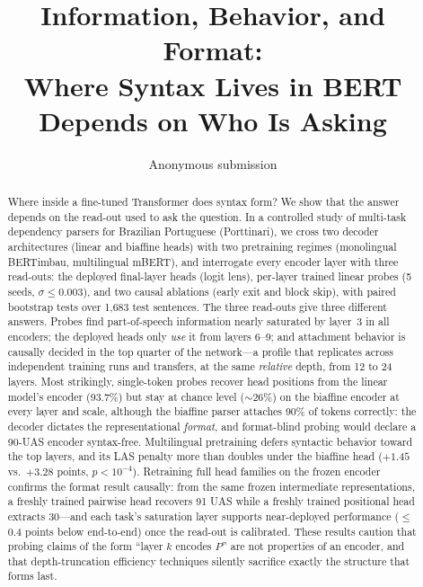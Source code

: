 \documentclass[letterpaper]{article}
\title{Information, Behavior, and Format:\\
Where Syntax Lives in BERT Depends on Who Is Asking}
\author{Anonymous submission}
\begin{document}
\maketitle

\begin{abstract}
Where inside a fine-tuned Transformer does syntax form? We show that the answer
depends on the read-out used to ask the question. In a controlled study of
multi-task dependency parsers for Brazilian Portuguese (Porttinari), we cross
two decoder architectures (linear and biaffine heads) with two pretraining
regimes (monolingual BERTimbau, multilingual mBERT), and interrogate every
encoder layer with three read-outs: the deployed final-layer heads (logit
lens), per-layer trained linear probes (5 seeds, $\sigma \leq 0.003$), and two
causal ablations (early exit and block skip), with paired bootstrap tests over
1{,}683 test sentences. The three read-outs give three different answers.
Probes find part-of-speech information nearly saturated by layer~3 in all
encoders; the deployed heads only \emph{use} it from layers 6--9; and
attachment behavior is causally decided in the top quarter of the network---a
profile that replicates across independent training runs and transfers, at the
same \emph{relative} depth, from 12 to 24 layers. Most strikingly, single-token
probes recover head positions from the linear model's encoder (93.7\%) but
stay at chance level ($\sim$26\%) on the biaffine encoder at every layer and
scale, although the biaffine parser attaches 90\% of tokens correctly: the
decoder dictates the representational \emph{format}, and format-blind probing
would declare a 90-UAS encoder syntax-free. Multilingual pretraining defers
syntactic behavior toward the top layers, and its LAS penalty more than
doubles under the biaffine head ($+1.45$ vs.\ $+3.28$ points, $p<10^{-4}$).
Retraining full head families on the frozen encoder confirms the format
result causally: from the same frozen intermediate representations, a freshly
trained pairwise head recovers 91 UAS while a freshly trained positional head
extracts 30---and each task's saturation layer supports near-deployed
performance ($\leq$0.4 points below end-to-end) once the read-out is
calibrated. These results caution that probing claims of the form ``layer $k$
encodes $P$'' are not properties of an encoder, and that depth-truncation
efficiency techniques silently sacrifice exactly the structure that forms
last.
\end{abstract}
\end{document}
